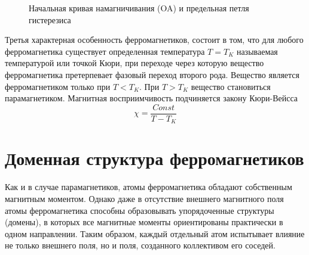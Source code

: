 \documentclass[a4paper,14pt]{article} %
\begin{document}
\begin{figure}[H]
	\caption{Начальная кривая намагничивания (OA) и предельная петля гистерезиса}
\end{figure}

Третья характерная особенность ферромагнетиков, состоит в том, что для любого ферромагнетика существует определенная температура $T = T_K$ называемая температурой или точкой Кюри, при переходе через которую вещество ферромагнетика претерпевает фазовый переход второго рода. Вещество является ферромагнетиком только при $T < T_K$. При $T > T_K$ вещество становиться парамагнетиком. Магнитная восприимчивость подчиняется закону Кюри-Вейсса 
\[\chi = \frac{Const}{T - T_K}\]

\section{Доменная структура ферромагнетиков}
Как и в случае парамагнетиков, атомы ферромагнетика обладают собственным магнитным моментом. Однако даже в отсутствие внешнего магнитного поля атомы ферромагнетика способны образовывать упорядоченные структуры (домены), в которых все магнитные моменты ориентированы практически в одном направлении. Таким образом, каждый отдельный атом испытывает влияние не только внешнего поля, но и поля, созданного коллективом его соседей.
\end{document}
